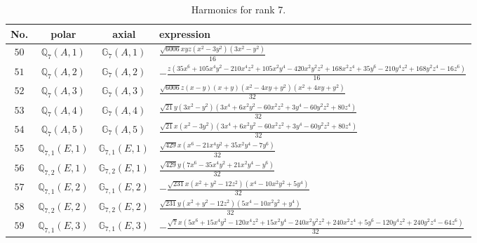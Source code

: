 \documentclass[fleqn,8pt,landscape]{jsarticle}
\begin{document}
\begin{table}[ht!]
\begin{center}
\caption{Harmonics for rank 7.}
\renewcommand{\arraystretch}{1.3}
\begin{tabular}{cccl} \hline \hline
No. & polar & axial & expression \\ \hline
$ 50 $ & $ \mathbb{Q}_{7}(A,1) $ & $ \mathbb{G}_{7}(A,1) $ & $ \frac{\sqrt{6006} x y z \left(x^{2} - 3 y^{2}\right) \left(3 x^{2} - y^{2}\right)}{16} $ \\
$ 51 $ & $ \mathbb{Q}_{7}(A,2) $ & $ \mathbb{G}_{7}(A,2) $ & $ - \frac{z \left(35 x^{6} + 105 x^{4} y^{2} - 210 x^{4} z^{2} + 105 x^{2} y^{4} - 420 x^{2} y^{2} z^{2} + 168 x^{2} z^{4} + 35 y^{6} - 210 y^{4} z^{2} + 168 y^{2} z^{4} - 16 z^{6}\right)}{16} $ \\
$ 52 $ & $ \mathbb{Q}_{7}(A,3) $ & $ \mathbb{G}_{7}(A,3) $ & $ \frac{\sqrt{6006} z \left(x - y\right) \left(x + y\right) \left(x^{2} - 4 x y + y^{2}\right) \left(x^{2} + 4 x y + y^{2}\right)}{32} $ \\
$ 53 $ & $ \mathbb{Q}_{7}(A,4) $ & $ \mathbb{G}_{7}(A,4) $ & $ \frac{\sqrt{21} y \left(3 x^{2} - y^{2}\right) \left(3 x^{4} + 6 x^{2} y^{2} - 60 x^{2} z^{2} + 3 y^{4} - 60 y^{2} z^{2} + 80 z^{4}\right)}{32} $ \\
$ 54 $ & $ \mathbb{Q}_{7}(A,5) $ & $ \mathbb{G}_{7}(A,5) $ & $ \frac{\sqrt{21} x \left(x^{2} - 3 y^{2}\right) \left(3 x^{4} + 6 x^{2} y^{2} - 60 x^{2} z^{2} + 3 y^{4} - 60 y^{2} z^{2} + 80 z^{4}\right)}{32} $ \\
$ 55 $ & $ \mathbb{Q}_{7,1}(E,1) $ & $ \mathbb{G}_{7,1}(E,1) $ & $ \frac{\sqrt{429} x \left(x^{6} - 21 x^{4} y^{2} + 35 x^{2} y^{4} - 7 y^{6}\right)}{32} $ \\
$ 56 $ & $ \mathbb{Q}_{7,2}(E,1) $ & $ \mathbb{G}_{7,2}(E,1) $ & $ \frac{\sqrt{429} y \left(7 x^{6} - 35 x^{4} y^{2} + 21 x^{2} y^{4} - y^{6}\right)}{32} $ \\
$ 57 $ & $ \mathbb{Q}_{7,1}(E,2) $ & $ \mathbb{G}_{7,1}(E,2) $ & $ - \frac{\sqrt{231} x \left(x^{2} + y^{2} - 12 z^{2}\right) \left(x^{4} - 10 x^{2} y^{2} + 5 y^{4}\right)}{32} $ \\
$ 58 $ & $ \mathbb{Q}_{7,2}(E,2) $ & $ \mathbb{G}_{7,2}(E,2) $ & $ \frac{\sqrt{231} y \left(x^{2} + y^{2} - 12 z^{2}\right) \left(5 x^{4} - 10 x^{2} y^{2} + y^{4}\right)}{32} $ \\
$ 59 $ & $ \mathbb{Q}_{7,1}(E,3) $ & $ \mathbb{G}_{7,1}(E,3) $ & $ - \frac{\sqrt{7} x \left(5 x^{6} + 15 x^{4} y^{2} - 120 x^{4} z^{2} + 15 x^{2} y^{4} - 240 x^{2} y^{2} z^{2} + 240 x^{2} z^{4} + 5 y^{6} - 120 y^{4} z^{2} + 240 y^{2} z^{4} - 64 z^{6}\right)}{32} $ \\

\end{tabular}
\end{center}
\end{table}
\end{document}
